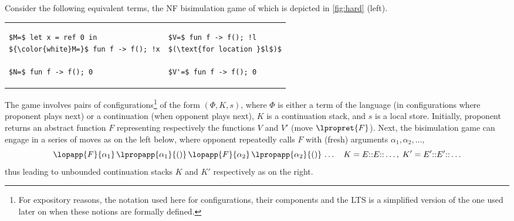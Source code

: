 \begin{example}\label{ex:dummy}
Consider the following equivalent terms, the NF bisimulation game of which is depicted in \cref{fig:hard} (left).%
\medskip

\begin{tabular}{@{\qquad}l@{\qquad}|@{\qquad}l}
\begin{lstlisting}[boxpos=m]
$M=$ let x = ref 0 in
${\color{white}M=}$ fun f -> f(); !x

$N=$ fun f -> f(); 0
\end{lstlisting}
  &
\begin{lstlisting}[boxpos=m]
$V=$ fun f -> f(); !l
$(\text{for location }$l$)$

$V'=$ fun f -> f(); 0
\end{lstlisting}
\end{tabular}
\medskip

\noindent
The game involves
pairs of configurations\footnote{For expository reasons, the notation used here for configurations, their components and the LTS is a simplified version of the one used later on when these notions are formally defined.} of the form $(\Phi,K,s)$, where $\Phi$ is either a term of the language (in configurations where proponent plays next) or a continuation (when opponent plays next), $K$ is a continuation stack, and $s$ is a local store. Initially,
proponent returns an abstract function $F$ representing respectively
the functions $V$ and $V'$ (move $\lpropret{F}$).
Next, the bisimulation game can engage in a series of moves as on the left below, where opponent repeatedly calls $F$ with (fresh) arguments $\alpha_1,\alpha_2,\dots$,
\[
  \lopapp{F}{\alpha_1}\,\lpropapp{\alpha_1}{()}\,\lopapp{F}{\alpha_2}\,\lpropapp{\alpha_2}{()}\,\dots\quad
  K = E{::}E{::}\ldots,\; K'=E'{::}E'{::}\ldots
\]
thus leading to unbounded continuation stacks $K$ and $K'$ respectively as on the right.


\end{example}

